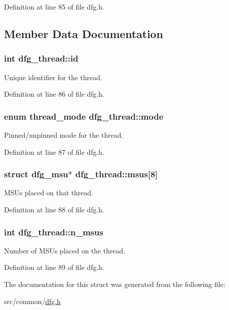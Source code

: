 Definition at line 85 of file dfg.\-h.



\subsection{Member Data Documentation}
\hypertarget{structdfg__thread_a1f44ee61a43ca981d995f3bccd2a2ae9}{
\subsubsection[{id}]{\setlength{\rightskip}{0pt plus 5cm}int dfg\-\_\-thread\-::id}}\label{structdfg__thread_a1f44ee61a43ca981d995f3bccd2a2ae9}


Unique identifier for the thread. 



Definition at line 86 of file dfg.\-h.

\hypertarget{structdfg__thread_a38d082c617509a7343088e1f6db9becd}{
\subsubsection[{mode}]{\setlength{\rightskip}{0pt plus 5cm}enum {\bf thread\-\_\-mode} dfg\-\_\-thread\-::mode}}\label{structdfg__thread_a38d082c617509a7343088e1f6db9becd}


Pinned/unpinned mode for the thread. 



Definition at line 87 of file dfg.\-h.

\hypertarget{structdfg__thread_a31973f7c62c54be9c6fb0c6ad1c7609e}{
\subsubsection[{msus}]{\setlength{\rightskip}{0pt plus 5cm}struct {\bf dfg\-\_\-msu}$\ast$ dfg\-\_\-thread\-::msus\mbox{[}8\mbox{]}}}\label{structdfg__thread_a31973f7c62c54be9c6fb0c6ad1c7609e}


M\-S\-Us placed on that thread. 



Definition at line 88 of file dfg.\-h.

\hypertarget{structdfg__thread_a2111899465e37d56cdf83654e280aa82}{
\subsubsection[{n\-\_\-msus}]{\setlength{\rightskip}{0pt plus 5cm}int dfg\-\_\-thread\-::n\-\_\-msus}}\label{structdfg__thread_a2111899465e37d56cdf83654e280aa82}


Number of M\-S\-Us placed on the thread. 



Definition at line 89 of file dfg.\-h.



The documentation for this struct was generated from the following file\-:\begin{DoxyCompactItemize}
\item 
src/common/\hyperlink{dfg_8h}{dfg.\-h}\end{DoxyCompactItemize}
